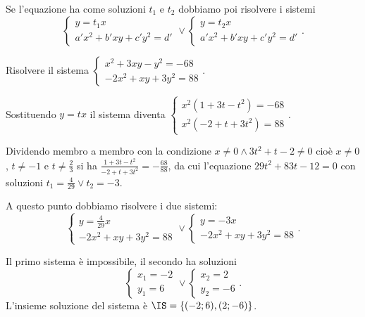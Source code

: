 Se l'equazione ha come soluzioni \(t_1\) e \(t_2\) dobbiamo poi risolvere i sistemi \[ \left\{\begin{array}{l}y=t_1x \\a'x^2+b'{xy}+c'y^2=d' \end{array}\right.\vee\left\{\begin{array}{l}y=t_2x \\a'x^2+b'{xy}+c'y^2=d' \end{array}\right.. \]
\newpage
\begin{exrig}
\begin{esempio}
Risolvere il sistema \(\left\{\begin{array}{l}x^2+3{xy}-y^2=-68 \\-2x^2+{xy}+3y^2=88 \end{array}\right.\).

Sostituendo \(y={tx}\) il sistema diventa \(\left\{\begin{array}{l}x^2(1+3t-t^2)=-68 \\x^2(-2+t+3t^2)=88 \end{array}\right.\).

Dividendo membro a membro con la condizione \(x\neq 0\wedge 3t^2+t-2\neq 0\) cioè \(x\neq 0\), \(t\neq -1\) e \(t\neq \frac 2 3\) si ha \(\frac{1+3t-t^2}{-2+t+3t^2}=-\frac{68}{88}\), da cui l'equazione \(29t^2+83t-12=0\) con soluzioni \(t_1=\frac 4{29}\vee t_2=-3\).

A questo punto dobbiamo risolvere i due sistemi:\[ \left\{\begin{array}{l}y=\frac 4{29}x \\-2x^2+{xy}+3y^2=88 \end{array}\right.\vee\left\{\begin{array}{l}y=-3x \\-2x^2+{xy}+3y^2=88 \end{array}\right.. \]

Il primo sistema è impossibile, il secondo ha soluzioni 
\[\left\{\begin{array}{l}x_1=-2\\y_1=6\end{array}\right.\vee\left\{\begin{array}{l}x_2=2\\y_2=-6\end{array}\right..\] 
L'insieme soluzione del sistema è \(\IS=\{(-2;6),(2;-6)\}\).
\end{esempio}
\end{exrig}

